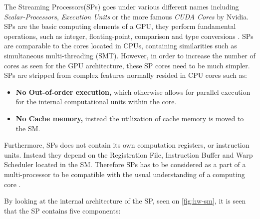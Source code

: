 The Streaming Processors(SPs) goes under various different names including \textit{Scalar-Processors}, \textit{Execution Units} or the more famous \textit{CUDA Cores} by Nvidia.
SPs are the basic computing elements of a GPU, they perform fundamental operations, such as integer, floating-point, comparison and type conversions \cite{Li2016}.
SPs are comparable to the cores located in CPUs, containing similarities such as simultaneous multi-threading (SMT).
However, in order to increase the number of cores as seen for the GPU architecture, these SP cores need to be much simpler.
SPs are stripped from complex features normally resided in CPU cores such as:

\begin{itemize}
	\item \textbf{No Out-of-order execution,} which otherwise allows for parallel execution for the internal computational units within the core. 
	\item \textbf{No Cache memory,} instead the utilization of cache memory is moved to the SM. 
\end{itemize}

Furthermore, SPs does not contain its own computation registers, or instruction units.
Instead they depend on the Registration File, Instruction Buffer and Warp Scheduler located in the SM.
Therefore SPs has to be considered as a part of a multi-processor to be compatible with the usual understanding of a computing core \cite{Maitre2013}.

By looking at the internal architecture of the SP, seen on \cref{fig:hw-sm}, it is seen that the SP contains five components:

